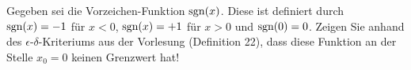 \item Gegeben sei die Vorzeichen-Funktion $\text{sgn}(x)$. Diese ist definiert durch $\text{sgn}(x)=-1$ für $x<0$, $\text{sgn}(x)=+1$ für $x>0$ und $\text{sgn}(0) = 0$. Zeigen Sie anhand des $\epsilon$-$\delta$-Kriteriums aus der Vorlesung (Definition 22), dass diese Funktion an der Stelle $x_0=0$ keinen Grenzwert hat!